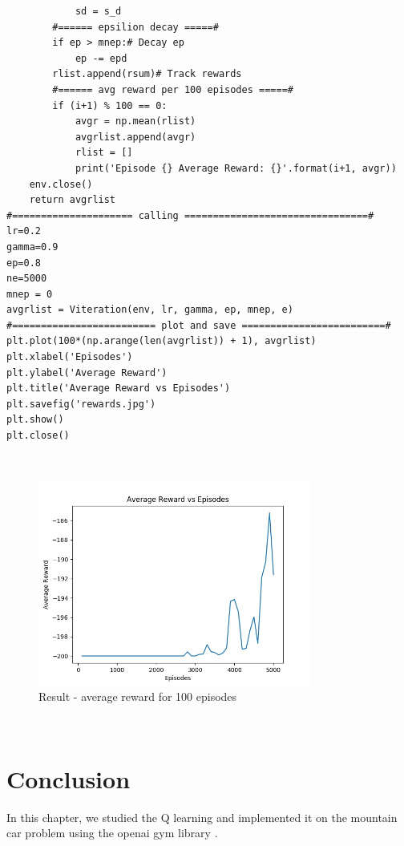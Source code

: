 \begin{verbatim}
            sd = s_d
        #====== epsilion decay =====#
        if ep > mnep:# Decay ep
            ep -= epd
        rlist.append(rsum)# Track rewards
        #====== avg reward per 100 episodes =====#
        if (i+1) % 100 == 0:
            avgr = np.mean(rlist)
            avgrlist.append(avgr)
            rlist = []
            print('Episode {} Average Reward: {}'.format(i+1, avgr))
    env.close()
    return avgrlist
#===================== calling ================================#
lr=0.2
gamma=0.9
ep=0.8
ne=5000
mnep = 0
avgrlist = Viteration(env, lr, gamma, ep, mnep, e)
#========================= plot and save =========================#
plt.plot(100*(np.arange(len(avgrlist)) + 1), avgrlist)
plt.xlabel('Episodes')
plt.ylabel('Average Reward')
plt.title('Average Reward vs Episodes')
plt.savefig('rewards.jpg')
plt.show()
plt.close()
\end{verbatim}
\\
\newline \begin{figure}
    \centering
    \includegraphics[width=0.8\textwidth]{images/rewards.jpg}
    \caption{Result - average reward for 100 episodes}
\end{figure}
\newline \\
\newline \section{Conclusion}
In this chapter, we studied the Q learning and implemented it on the mountain car problem using the openai gym library .

